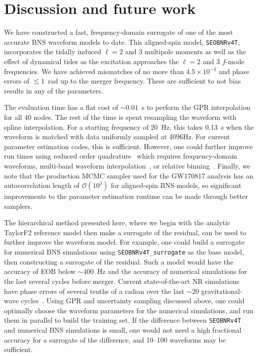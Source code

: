 \documentclass[prd,aps,letter,twocolumn,floatfix,notitlepage,nofootinbib]{revtex4-1}
\begin{document}
\section{Discussion and future work}
\label{sec:discussion}

We have constructed a fast, frequency-domain surrogate of one of the most accurate BNS waveform models to date. This aligned-spin model, \texttt{SEOBNRv4T}, incorporates the tidally induced $\ell=2$ and 3 multipole moments as well as the effect of dynamical tides as the excitation approaches the $\ell=2$ and 3 $f$-mode frequencies. We have achieved mismatches of no more than $4.5 \times 10^{-4}$ and phase errors of $\lesssim 1$~rad up to the merger frequency. These are sufficient to not bias results in any of the parameters.

The evaluation time has a flat cost of $\sim 0.01$~s to perform the GPR interpolation for all 40 nodes. The rest of the time is spent resampling the waveform with spline interpolation. For a starting frequency of 20~Hz, this takes 0.13~s when the waveform is matched with data uniformly sampled at 4096Hz. For current parameter estimation codes, this is sufficient. However, one could further improve run times using reduced order quadrature~\cite{Antil2013, CanizaresFieldGair2013, CanizaresFieldGair2015, Smith:2016qas} which requires frequency-domain waveforms, multi-band waveform interpolation~\cite{VinciguerraVeitchMandel2017}, or relative binning~\cite{Zackay:2018qdy}. Finally, we note that the production MCMC sampler used for the GW170817 analysis has an autocorrelation length of $\mathcal{O}(10^3)$ for aligned-spin BNS models, so significant improvements to the parameter estimation runtime can be made through better samplers. 

The hierarchical method presented here, where we begin with the analytic TaylorF2 reference model then make a surrogate of the residual, can be used to further improve the waveform model. For example, one could build a surrogate for numerical BNS simulations using \texttt{SEOBNRv4T\_surrogate} as the base model, then constructing a surrogate of the residual. Such a model would have the accuracy of EOB below $\sim 400$~Hz and the accuracy of numerical simulations for the last several cycles before merger. Current state-of-the-art NR simulations have phase errors of several tenths of a radian over the last $\sim 20$ gravitational-wave cycles~\cite{DietrichHinderer2017, KiuchiKawaguchiKyutoku2017}. Using GPR and uncertainty sampling discussed above, one could optimally choose the waveform parameters for the numerical simulations, and run them in parallel to build the training set. If the difference between \texttt{SEOBNRv4T} and numerical BNS simulations is small, one would not need a high fractional accuracy for a surrogate of the difference, and 10--100 waveforms may be sufficient.
\end{document}
